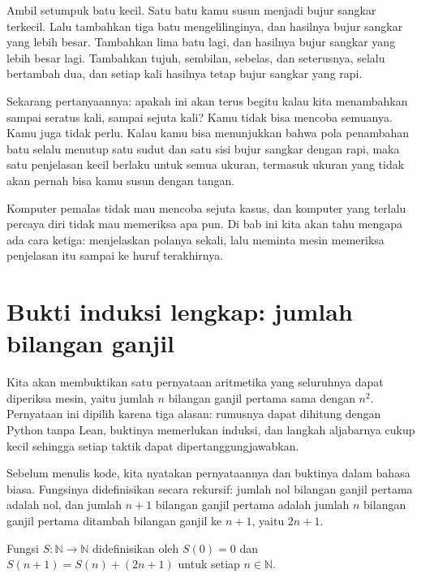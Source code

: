 \begin{untukanak}
Ambil setumpuk batu kecil. Satu batu kamu susun menjadi bujur sangkar terkecil. Lalu tambahkan
tiga batu mengelilinginya, dan hasilnya bujur sangkar yang lebih besar. Tambahkan lima batu lagi,
dan hasilnya bujur sangkar yang lebih besar lagi. Tambahkan tujuh, sembilan, sebelas, dan
seterusnya, selalu bertambah dua, dan setiap kali hasilnya tetap bujur sangkar yang rapi.

Sekarang pertanyaannya: apakah ini akan terus begitu kalau kita menambahkan sampai seratus kali,
sampai sejuta kali? Kamu tidak bisa mencoba semuanya. Kamu juga tidak perlu. Kalau kamu bisa
menunjukkan bahwa pola penambahan batu selalu menutup satu sudut dan satu sisi bujur sangkar
dengan rapi, maka satu penjelasan kecil berlaku untuk semua ukuran, termasuk ukuran yang tidak
akan pernah bisa kamu susun dengan tangan.

Komputer pemalas tidak mau mencoba sejuta kasus, dan komputer yang terlalu percaya diri tidak mau
memeriksa apa pun. Di bab ini kita akan tahu mengapa ada cara ketiga: menjelaskan polanya sekali,
lalu meminta mesin memeriksa penjelasan itu sampai ke huruf terakhirnya.
\end{untukanak}

\section{Bukti induksi lengkap: jumlah bilangan ganjil}


Kita akan membuktikan satu pernyataan aritmetika yang seluruhnya dapat diperiksa mesin, yaitu
jumlah $n$ bilangan ganjil pertama sama dengan $n^{2}$. Pernyataan ini dipilih karena tiga alasan:
rumusnya dapat dihitung dengan Python tanpa Lean, buktinya memerlukan induksi, dan langkah
aljabarnya cukup kecil sehingga setiap taktik dapat dipertanggungjawabkan.


Sebelum menulis kode, kita nyatakan pernyataannya dan buktinya dalam bahasa biasa. Fungsinya
didefinisikan secara rekursif: jumlah nol bilangan ganjil pertama adalah nol, dan jumlah $n+1$
bilangan ganjil pertama adalah jumlah $n$ bilangan ganjil pertama ditambah bilangan ganjil ke
$n+1$, yaitu $2n+1$.

\begin{definisi}
Fungsi $S:\mathbb{N}\to\mathbb{N}$ didefinisikan oleh $S(0)=0$ dan
$S(n+1)=S(n)+(2n+1)$ untuk setiap $n\in\mathbb{N}$.
\end{definisi}

